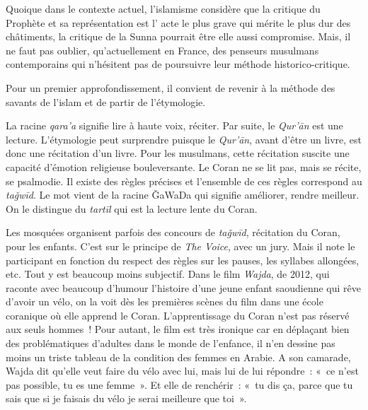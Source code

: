 Quoique dans le contexte actuel, l’islamisme considère que la critique du Prophète et sa représentation est l' acte le plus grave qui mérite le plus dur des châtiments, la critique de la Sunna pourrait être elle aussi compromise. Mais, il ne faut pas oublier, qu'actuellement en France, des penseurs musulmans contemporains qui n'hésitent pas de poursuivre leur méthode historico-critique. 

 Pour un premier approfondissement, il
convient de revenir à la méthode des savants de l'islam et de partir de
l'étymologie.


La racine \emph{qara'a} signifie lire à haute voix, réciter. Par suite,
le \emph{Qur'ān} est une lecture. L'étymologie peut surprendre puisque
le \emph{Qur'ān}, avant d'être un livre, est donc une récitation d'un
livre. Pour les musulmans, cette récitation suscite une capacité
d'émotion religieuse bouleversante. Le Coran ne se lit pas, mais se
récite, se psalmodie. Il existe des règles précises et l'ensemble de ces
règles correspond au \emph{taǧwīd}. Le mot vient de la racine ǦaWaDa qui
signifie améliorer, rendre meilleur. On le distingue du \emph{tartīl}
qui est la lecture lente du Coran.

Les mosquées organisent parfois des concours de \emph{taǧwīd},
récitation du Coran, pour les enfants. C'est sur le principe de
\emph{The Voice}, avec un jury. Mais il note le participant en fonction
du respect des règles sur les pauses, les syllabes allongées, etc. Tout
y est beaucoup moins subjectif. Dans le film \emph{Wajda}, de 2012, qui
raconte avec beaucoup d'humour l'histoire d'une jeune enfant saoudienne
qui rêve d'avoir un vélo, on la voit dès les premières scènes du film
dans une école coranique où elle apprend le Coran. L'apprentissage du
Coran n'est pas réservé aux seuls hommes~! Pour autant, le film est très
ironique car en déplaçant bien des problématiques d'adultes dans le
monde de l'enfance, il n'en dessine pas moins un triste tableau de la
condition des femmes en Arabie. A son camarade, Wajda dit qu'elle veut
faire du vélo avec lui, mais lui de lui répondre~: «~ce n'est pas
possible, tu es une femme~». Et elle de renchérir~: «~tu dis ça, parce
que tu sais que si je faisais du vélo je serai meilleure que toi~».


